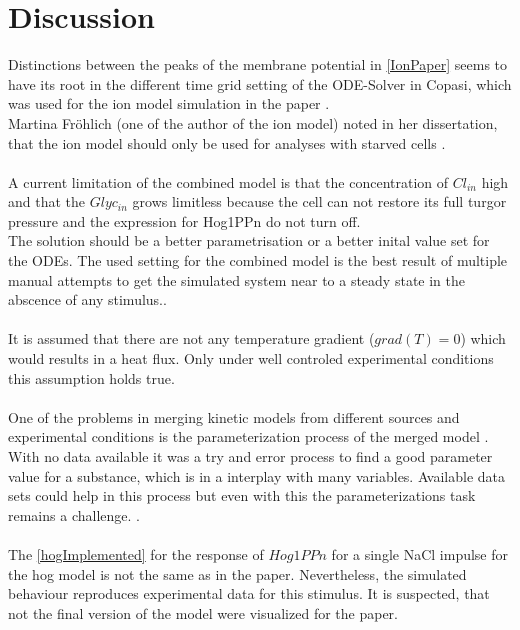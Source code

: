 \section{Discussion}
Distinctions between the peaks of the membrane potential in \ref{IonPaper} seems to have its root in the different time grid setting of the ODE-Solver in Copasi, which was used for the ion model simulation in the paper \cite{Gerber_2016}.\\
Martina Fröhlich (one of the author of the ion model) noted in her dissertation, that the ion model should only be used for analyses with starved cells \cite{martinafroehlich}.\\\\
A current limitation of the combined model is that the concentration of $Cl_{in}$ high and that the $Glyc_{in}$ grows limitless because the cell can not restore its full turgor pressure and the expression for Hog1PPn do not turn off.\\ The solution should be a better parametrisation or a better inital value set for the ODEs. The used setting for the combined model is the best result of multiple manual attempts to get the simulated system near to a steady state in the abscence of any stimulus..\\\\
It is assumed that there are not any temperature gradient ($grad(T)=0$) which would results in a heat flux. Only under well controled experimental conditions this assumption holds true.\\\\
One of the problems in merging kinetic models from different sources and experimental conditions is the parameterization process of the merged model \cite{Wang2017}. With no data available it was a try and error process to find a good parameter value for a substance, which is in a interplay with many variables. Available data sets could help in this process but even with this the parameterizations task remains a challenge. \cite{Ke_2013}. \\\\
The  \ref{hogImplemented} for the response of $Hog1PPn$ for a single NaCl impulse for the hog model is not the same as in the paper. Nevertheless, the simulated behaviour reproduces experimental data for this stimulus. It is suspected, that not the final version of the model were visualized for the paper.\\\\
\newpage

